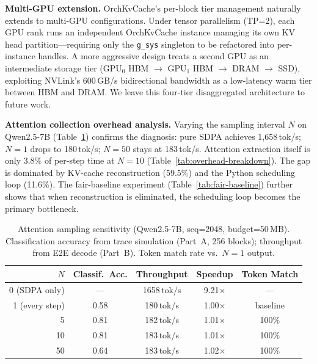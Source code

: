 \documentclass[conference]{IEEEtran}
\begin{document}
\textbf{Multi-GPU extension.} OrchKvCache's per-block tier management naturally extends to multi-GPU configurations. Under tensor parallelism (TP=2), each GPU rank runs an independent OrchKvCache instance managing its own KV head partition---requiring only the \texttt{g\_sys} singleton to be refactored into per-instance handles. A more aggressive design treats a second GPU as an intermediate storage tier (GPU$_0$ HBM $\to$ GPU$_1$ HBM $\to$ DRAM $\to$ SSD), exploiting NVLink's 600\,GB/s bidirectional bandwidth as a low-latency warm tier between HBM and DRAM. We leave this four-tier disaggregated architecture to future work.

\textbf{Attention collection overhead analysis.}
Varying the sampling interval $N$ on Qwen2.5-7B (Table~\ref{tab:sampling}) confirms the diagnosis: pure SDPA achieves 1,658\,tok/s; $N{=}1$ drops to 180\,tok/s; $N{=}50$ stays at 183\,tok/s.  Attention extraction itself is only 3.8\% of per-step time at $N{=}10$ (Table~\ref{tab:overhead-breakdown}).  The gap is dominated by KV-cache reconstruction (59.5\%) and the Python scheduling loop (11.6\%).  The fair-baseline experiment (Table~\ref{tab:fair-baseline}) further shows that when reconstruction is eliminated, the scheduling loop becomes the primary bottleneck.

\begin{table}[t]
\centering
\caption{Attention sampling sensitivity (Qwen2.5-7B, seq=2048, budget=50\,MB). Classification accuracy from trace simulation (Part~A, 256 blocks); throughput from E2E decode (Part~B). Token match rate vs.\ $N{=}1$ output.}
\label{tab:sampling}
\small
\begin{tabular}{@{}rcccc@{}}
\toprule
$N$ & Classif.\ Acc. & Throughput & Speedup & Token Match \\
\midrule
0 (SDPA only) & --- & 1658\,tok/s & 9.21$\times$ & --- \\
1 (every step) & 0.58 & 180\,tok/s & 1.00$\times$ & baseline \\
5 & 0.81 & 182\,tok/s & 1.01$\times$ & 100\% \\
10 & 0.81 & 183\,tok/s & 1.01$\times$ & 100\% \\
50 & 0.64 & 183\,tok/s & 1.02$\times$ & 100\% \\
\bottomrule
\end{tabular}
\end{table}
\end{document}
